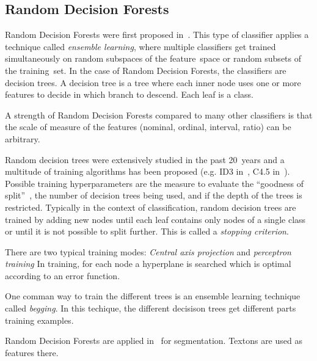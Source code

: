 \subsection{Random Decision Forests}\label{subsec:random-forests}
Random Decision Forests were first proposed in~\cite{ho1995random}. This type
of classifier applies a technique called \textit{ensemble learning}, where
multiple classifiers get trained simultaneously on random subspaces of the
feature~space or random subsets of the training~set. In the case of Random
Decision Forests, the classifiers are decision trees. A decision tree is a tree
where each inner node uses one or more features to decide in which branch to
descend. Each leaf is a class.

A strength of Random Decision Forests compared to many other classifiers is
that the scale of measure of the features (nominal, ordinal, interval, ratio)
can be arbitrary.

Random decision trees were extensively studied in the past 20~years and a
multitude of training algorithms has been proposed (e.g. ID3
in~\cite{quinlan1986induction}, C4.5 in~\cite{quinlan2014c4}). Possible
training hyperparameters are the measure to evaluate the \enquote{goodness of
split}~\cite{raey89empirical}, the number of decision trees being used, and if
the depth of the trees is restricted. Typically in the context of
classification, random decision trees are trained by adding new nodes until
each leaf contains only nodes of a single class or until it is not possible to
split further. This is called a \textit{stopping criterion}.

There are two typical training modes: \textit{Central axis projection} and
\textit{perceptron training} In training, for each node a hyperplane is
searched which is optimal according to an error function.

One comman way to train the different trees is an ensemble learning technique
called \textit{begging}. In this techique, the different decisison trees get
different parts training examples.

Random Decision Forests are applied in~\cite{shotton2008semantic} for
segmentation. Textons are used as features there.
